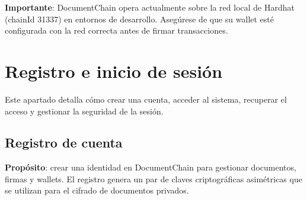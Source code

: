 \documentclass[11pt, a4paper]{article}
\begin{document}
\textbf{Importante}: DocumentChain opera actualmente sobre la red local de Hardhat (chainId 31337) en entornos de desarrollo. Aseg\'{u}rese de que su wallet est\'{e} configurada con la red correcta antes de firmar transacciones.

\section{Registro e inicio de sesi\'{o}n}

Este apartado detalla c\'{o}mo crear una cuenta, acceder al sistema, recuperar el acceso y gestionar la seguridad de la sesi\'{o}n.

\subsection{Registro de cuenta}

\textbf{Prop\'{o}sito}: crear una identidad en DocumentChain para gestionar documentos, firmas y wallets. El registro genera un par de claves criptogr\'{a}ficas asim\'{e}tricas que se utilizan para el cifrado de documentos privados.
\end{document}
